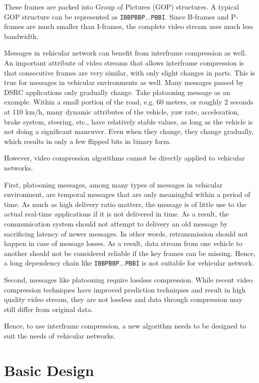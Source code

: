 \documentclass[12pt]{report}
\begin{document}
These frames are packed into Group of Pictures (GOP) structures. A typical GOP structure can be represented as \texttt{IBBPBBP$\ldots$PBBI}. Since B-frames and P-frames are much smaller than I-frames, the complete video stream uses much less bandwidth.

Messages in vehicular network can benefit from interframe compression as well. An important attribute of video streams that allows interframe compression is that consecutive frames are very similar, with only slight changes in parts. This is true for messages in vehicular environments as well. Many messages passed by DSRC applications only gradually change. Take platooning message as an example. Within a small portion of the road, e.g. 60 meters, or roughly 2 seconds at 110 km/h, many dynamic attributes of the vehicle, yaw rate, acceleration, brake system, steering, etc., have relatively stable values, as long as the vehicle is not doing a significant maneuver. Even when they change, they change gradually, which results in only a few flipped bits in binary form.

However, video compression algorithms cannot be directly applied to vehicular networks.

First, platooning messages, among many types of messages in vehicular environment, are temporal messages that are only meaningful within a period of time. As much as high delivery ratio matters, the message is of little use to the actual real-time applications if it is not delivered in time. As a result, the communication system should not attempt to delivery an old message by sacrificing latency of newer messages. In other words, retransmission should not happen in case of message losses. As a result, data stream from one vehicle to another should not be considered reliable if the key frames can be missing. Hence, a long dependency chain like \texttt{IBBPBBP$\ldots$PBBI} is not suitable for vehicular network.

Second, messages like platooning require lossless compression. While recent video compression techniques have improved prediction techniques and result in high quality video stream, they are not lossless and data through compression may still differ from original data.

Hence, to use interframe compression, a new algorithm needs to be designed to suit the needs of vehicular networks.

\section{Basic Design}
\end{document}
